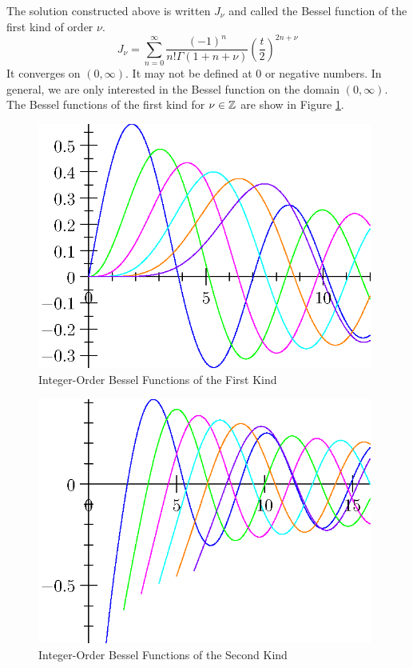 \documentclass[fleqn,letterpaper]{report}
\begin{document}
\begin{defn}
The solution constructed above is written $J_\nu$ and called
the Bessel function of the first kind of order $\nu$.
\begin{equation*}
J_{\nu} = \sum_{n=0}^\infty \frac{(-1)^n}{n! \Gamma(1+n+\nu)}
\left( \frac{t}{2} \right)^{2n+\nu} 
\end{equation*}
It converges on $(0, \infty)$. It may not be defined at 0 or
negative numbers. In general, we are only interested in the
Bessel function on the domain $(0, \infty)$. The Bessel
functions of the first kind for $\nu \in \mathbb{Z}$ are show in
Figure \ref{figure-bessel-first-kind}.
\end{defn}

\begin{figure}[t]
\centering
\includegraphics[width=11cm]{figure21.eps}
\caption{Integer-Order Bessel Functions of the First Kind}
\label{figure-bessel-first-kind}
\end{figure}

\begin{figure}[t]
\centering
\includegraphics[width=11cm]{figure22.eps}
\caption{Integer-Order Bessel Functions of the Second Kind}
\label{figure-bessel-second-kind}
\end{figure}
\end{document}

